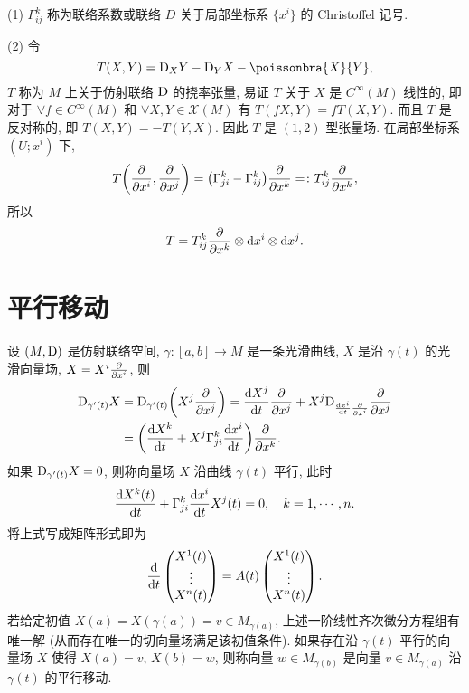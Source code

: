 \begin{remark}
  (1) $\Gamma_{ij}^k$ 称为联络系数或联络 $D$ 关于局部坐标系 $\{x^i\}$ 的 Christoffel 记号.

  (2) 令
  \[T(X,Y) = \D_XY - \D_YX - \poissonbra{X}{Y},\]
  $T$ 称为 $M$ 上关于仿射联络 $\mathrm{D}$ 的挠率张量, 易证 $T$ 关于 $X$ 是 $C^{\infty}(M)$
  线性的, 即对于 $\forall f\in C^{\infty}(M)$ 和 $\forall X,Y\in\mathscr{X}(M)$
  有 $T(fX,Y)=fT(X,Y)$. 而且 $T$ 是反对称的, 即 $T(X,Y)=-T(Y,X)$.
  因此 $T$ 是 $(1,2)$ 型张量场. 在局部坐标系 $(U;x^i)$ 下,
  \[T\biggl(\pdv{x^i},\pdv{x^j}\biggr)
    = \bigl(\Gamma_{ji}^k-\Gamma_{ij}^k\bigr)\pdv{x^k} =\colon T_{ij}^k\pdv{x^k},\]
  所以
  \[T = T_{ij}^k\pdv{x^k}\otimes\mathop{}\!\mathrm{d} x^i\otimes\mathop{}\!\mathrm{d} x^j.\]
\end{remark}



\section{平行移动}



设 $(M,\mathrm{D})$ 是仿射联络空间, $\gamma:[a,b]\to M$ 是一条光滑曲线, $X$ 是沿 $\gamma(t)$
的光滑向量场, $X=X^i\pdv{x^i}$, 则
\begin{align*}
  \D_{\gamma'(t)} X
  & = \D_{\gamma'(t)} \biggl(X^j\pdv{x^j}\biggr)
    = \frac{\diff X^j}{\diff t}\pdv{x^j} + X^j\D_{\frac{\diff x^i}{\diff t}\pdv{x^i}}\pdv{x^j} \\
  & = \biggl(\frac{\diff X^k}{\diff t} + X^j\Gamma_{ji}^k\frac{\diff x^i}{\diff t}\biggr)\pdv{x^k}.
\end{align*}
如果 $\mathrm{D}_{\gamma'(t)}X=0$, 则称向量场 $X$ 沿曲线 $\gamma(t)$ 平行, 此时
\begin{equation}\label{eq:1.4.1}
  \frac{\mathop{}\!\mathrm{d} X^k(t)}{\mathop{}\!\mathrm{d} t} + \Gamma_{ji}^k \frac{\mathop{}\!\mathrm{d} x^i}{\mathop{}\!\mathrm{d} t}X^j(t)=0,\quad k=1,\cdots,n.
\end{equation}
将上式写成矩阵形式即为
\[\frac{\mathop{}\!\mathrm{d}}{\mathop{}\!\mathrm{d} t}\begin{pmatrix}
  X^1(t) \\ \vdots \\ X^n(t)
\end{pmatrix} =
A(t)\begin{pmatrix}
  X^1(t) \\ \vdots \\ X^n(t)
\end{pmatrix}.\]
若给定初值 $X(a)=X(\gamma(a))=v\in M_{\gamma(a)}$, 上述一阶线性齐次微分方程组有唯一解
(从而存在唯一的切向量场满足该初值条件).
如果存在沿 $\gamma(t)$ 平行的向量场 $X$ 使得 $X(a)=v$, $X(b)=w$,
则称向量 $w\in M_{\gamma(b)}$ 是向量 $v\in M_{\gamma(a)}$ 沿 $\gamma(t)$ 的平行移动.

